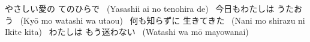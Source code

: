 やさしい愛の てのひらで 
(Yasashii ai no tenohira de) 
今日もわたしは うたおう 
(Kyō mo watashi wa utaou) 
何も知らずに 生きてきた 
(Nani mo shirazu ni Ikite kita) 
わたしは もう迷わない 
(Watashi wa mō mayowanai) 
